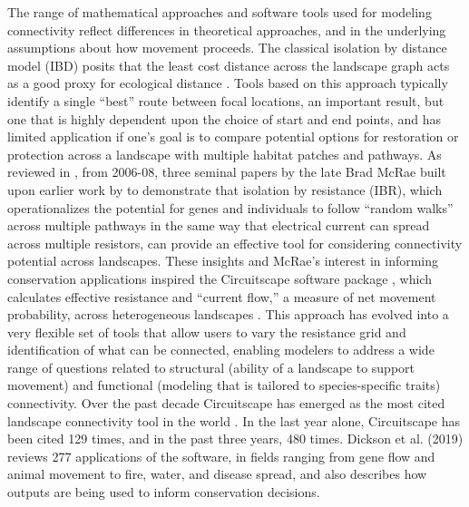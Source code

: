 \documentclass{juliacon}
\begin{document}
The range of mathematical approaches and software tools used for modeling connectivity reflect differences in theoretical approaches, and in the underlying assumptions about how movement proceeds. The classical isolation by distance model (IBD) posits that the least cost distance across the landscape graph acts as a good proxy for ecological distance \cite{wright1943isolation}.  Tools based on this approach typically identify a single “best” route between focal locations, an important result, but one that is highly dependent upon the choice of start and end points, and has limited application if one’s goal is to compare potential options for restoration or protection across a landscape with multiple habitat patches and pathways.  As reviewed in \cite{dickson2019circuit}, from 2006-08, three seminal papers by the late Brad McRae built upon earlier work by \cite{doyle1984random} to demonstrate that isolation by resistance (IBR)\cite{mcrae2006isolation}, which operationalizes the potential for genes and individuals to follow “random walks” across multiple pathways in the same way that electrical current can spread across multiple resistors, can provide an effective tool for considering connectivity potential across landscapes. These insights and McRae’s interest in informing conservation applications inspired the Circuitscape software package \cite{mcrae2008using}, which calculates effective resistance and “current flow,” a measure of net movement probability, across heterogeneous landscapes \cite{dickson2019circuit}.  This approach has evolved into a very flexible set of tools that allow users to vary the resistance grid and identification of what can be connected, enabling modelers to address a wide range of questions related to structural (ability of a landscape to support movement) and functional (modeling that is tailored to species-specific traits) connectivity.  
Over the past decade Circuitscape has emerged as the most cited landscape connectivity tool in the world \cite{dickson2019circuit}. In the last year alone, Circuitscape has been cited 129 times, and in the past three years, 480 times. Dickson et al. (2019) reviews 277 applications of the software, in fields ranging from gene flow and animal movement to fire, water, and disease spread, and also describes how outputs are being used to inform conservation decisions. 
\end{document}

